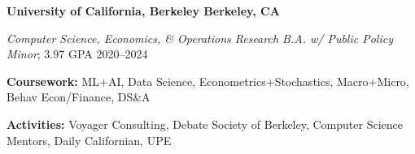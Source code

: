 \textbf{University of California, Berkeley \hfill Berkeley, CA} \par
\textit{Computer Science, Economics, \& Operations Research B.A. w/ Public Policy Minor}; 3.97 GPA \hfill 2020--2024\par
\textbf{Coursework:} ML+AI, Data Science, Econometrics+Stochastics, Macro+Micro, Behav Econ/Finance, DS\&A\par
\textbf{Activities:} Voyager Consulting, Debate Society of Berkeley, Computer Science Mentors, Daily Californian, UPE